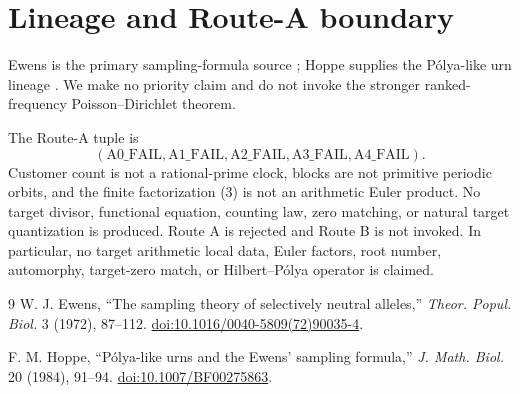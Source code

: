 \documentclass[10pt]{article}
\theoremstyle{remark}
\begin{document}
\section{Lineage and Route-A boundary}

Ewens is the primary sampling-formula source \cite{ewens}; Hoppe supplies
the P\'olya-like urn lineage \cite{hoppe}.  We make no priority claim and
do not invoke the stronger ranked-frequency Poisson--Dirichlet theorem.

The Route-A tuple is
\[
 (\mathrm{A0\_FAIL},\mathrm{A1\_FAIL},\mathrm{A2\_FAIL},
   \mathrm{A3\_FAIL},\mathrm{A4\_FAIL}).
\]
Customer count is not a rational-prime clock, blocks are not primitive
periodic orbits, and the finite factorization (3) is not an arithmetic Euler
product.  No target divisor, functional equation, counting law, zero
matching, or natural target quantization is produced.  Route A is rejected
and Route B is not invoked.  In particular, no target arithmetic local
data, Euler factors, root number, automorphy, target-zero match, or
Hilbert--P\'olya operator is claimed.

\begin{thebibliography}{9}
W. J. Ewens,
``The sampling theory of selectively neutral alleles,''
\emph{Theor. Popul. Biol.} 3 (1972), 87--112.
\href{https://doi.org/10.1016/0040-5809(72)90035-4}{doi:10.1016/0040-5809(72)90035-4}.

F. M. Hoppe,
``P\'olya-like urns and the Ewens' sampling formula,''
\emph{J. Math. Biol.} 20 (1984), 91--94.
\href{https://doi.org/10.1007/BF00275863}{doi:10.1007/BF00275863}.
\end{thebibliography}
\fi
\end{document}
